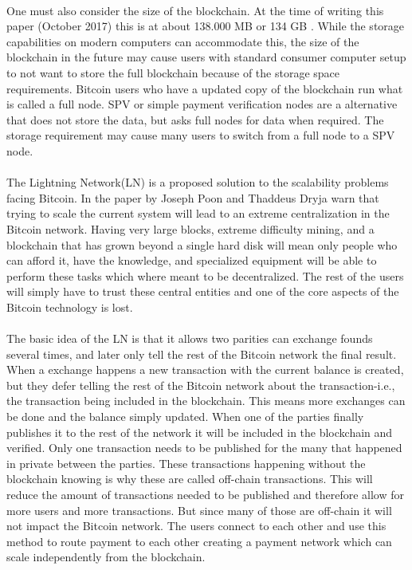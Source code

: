 \documentclass[informationsecurity]{gucmasterproject}
\begin{document}
\paragraph{}
One must also consider the size of the blockchain. At the time of writing this paper (October 2017) this is at about 138.000 MB or 134 GB \cite{blockchain_size}. While the storage capabilities on modern computers can accommodate this, the size of the blockchain in the future may cause users with standard consumer computer setup to not want to store the full blockchain because of the storage space requirements. Bitcoin users who have a updated copy of the blockchain run what is called a full node. SPV or simple payment verification nodes are a alternative that does not store the data, but asks full nodes for data when required. The storage requirement may cause many users to switch from a full node to a SPV node. 

\paragraph{}
The Lightning Network(LN) is a proposed solution to the scalability problems facing Bitcoin.
In the paper by Joseph Poon and Thaddeus Dryja \cite{poon2015bitcoin} warn that trying to scale the current system will lead to an extreme centralization in the Bitcoin network.
Having very large blocks, extreme difficulty mining, and a blockchain that has grown beyond a single hard disk will mean only people who can afford it, have the knowledge, and specialized equipment will be able to perform these tasks which where meant to be decentralized. The rest of the users will simply have to trust these central entities and one of the core aspects of the Bitcoin technology is lost.

\paragraph{}
The basic idea of the LN is that it allows two parities can exchange founds several times, and later only tell the rest of the Bitcoin network the final result.
When a exchange happens a new transaction with the current balance is created, but they defer telling the rest of the Bitcoin network about the transaction-i.e., the transaction being included in the blockchain. This means more exchanges can be done and the balance simply updated.
When one of the parties finally publishes it to the rest of the network it will be included in the blockchain and verified. Only one transaction needs to be published for the many that happened in private between the parties. These transactions happening without the blockchain knowing is why these are called off-chain transactions. This will reduce the amount of transactions needed to be published and therefore allow for more users and more transactions. But since many of those are off-chain it will not impact the Bitcoin network. The users connect to each other and use this method to route payment to each other creating a payment network which can scale independently from the blockchain.
\end{document}

